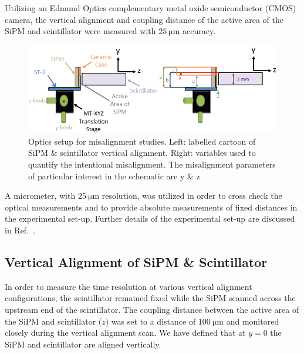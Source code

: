 Utilizing an Edmund Optics complementary metal oxide semiconductor (CMOS) camera, the vertical alignment and coupling distance of the active area of the SiPM and scintillator were measured with $25~\mathrm{\mu m}$ accuracy.
	\begin{figure}[!htb]
		\centering
		\includegraphics[width=1.0\columnwidth]{misalignment/figs/sipm_va_optics_schematic}
		\caption{Optics setup for misalignment studies.  Left: labelled cartoon of SiPM \&
		scintillator vertical alignment. Right: variables used to quantify the intentional misalignment.  The misalignment parameters of particular interest in the schematic are y \& z}
		\label{fig:sipm_va_optics}
	\end{figure}
A micrometer, with $25~\mathrm{\mu m}$ resolution, was utilized in order to cross check the optical measurements and to provide absolute measurements of fixed distances in the experimental set-up. Further details of the experimental set-up are discussed in Ref.~\cite{pooser16}.

\subsection{Vertical Alignment of SiPM \& Scintillator}
\label{sec:misalign_vert}


In order to measure the time resolution at various vertical alignment configurations, the scintillator remained fixed while the SiPM scanned across the upstream end of the scintillator. The coupling distance between the active area of the SiPM and scintillator ($z$) was set to a distance of $\mathrm{100\ \mu m}$ and monitored closely during the vertical alignment scan.  We have defined that at $y = 0$ the SiPM and scintillator are aligned vertically.  %

